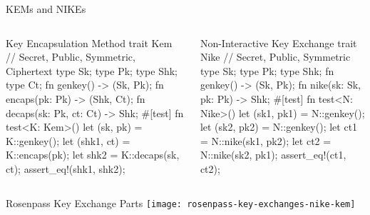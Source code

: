 \begin{frame}[fragile,T]{KEMs and NIKEs}
  \begin{columns}[t,fullwidth]
      \hfill
    \begin{column}{.48\linewidth}
\begin{rustblock}{Key Encapsulation Method}
trait Kem {
  // Secret, Public, Symmetric, Ciphertext
  type Sk; type Pk; type Shk; type Ct;
  fn genkey() -> (Sk, Pk);
  fn encaps(pk: Pk) -> (Shk, Ct);
  fn decaps(sk: Pk, ct: Ct) -> Shk;
}
#[test]
fn test<K: Kem>() {
  let (sk, pk) = K::genkey();
  let (shk1, ct) = K::encaps(pk);
  let shk2 = K::decaps(sk, ct);
  assert_eq!(shk1, shk2);
}
\end{rustblock}
    \end{column}
    \begin{column}{.48\linewidth}
\begin{rustblock}{Non-Interactive Key Exchange}
trait Nike {
  // Secret, Public, Symmetric
  type Sk; type Pk; type Shk;
  fn genkey() -> (Sk, Pk);
  fn nike(sk: Sk, pk: Pk) -> Shk;
}
#[test]
fn test<N: Nike>() {
  let (sk1, pk1) = N::genkey();
  let (sk2, pk2) = N::genkey();
  let ct1 = N::nike(sk1, pk2);
  let ct2 = N::nike(sk2, pk1);
  assert_eq!(ct1, ct2);
}
\end{rustblock}
    \end{column}
	\hfill
  \end{columns}
\end{frame}

\begin{frame}{Rosenpass Key Exchange Parts}
  \centering
  \texttt{[image: rosenpass-key-exchanges-nike-kem]}
\end{frame}








